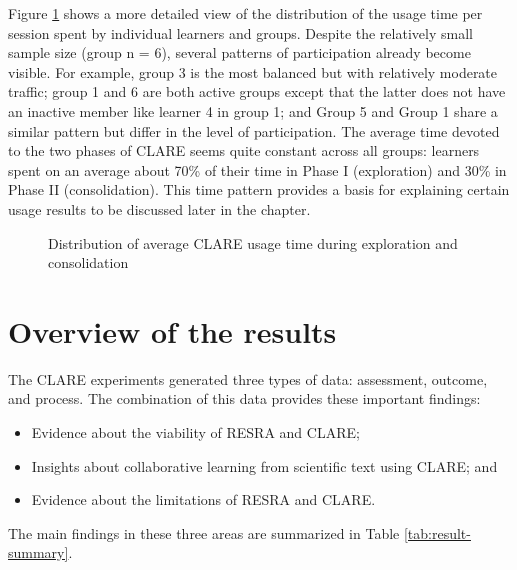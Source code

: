 Figure \ref{fig:time-distribution} shows a more detailed view of the
distribution of the usage time per session spent by individual learners and
groups. Despite the relatively small sample size (group n = 6), several
patterns of participation already become visible. For example, group 3 is
the most balanced but with relatively moderate traffic; group 1 and 6 are
both active groups except that the latter does not have an inactive member
like learner 4 in group 1; and Group 5 and Group 1 share a similar pattern
but differ in the level of participation. The average time devoted to the
two phases of CLARE seems quite constant across all groups: learners spent
on an average about 70\% of their time in Phase I (exploration) and 30\% in
Phase II (consolidation). This time pattern provides a basis for explaining
certain usage results to be discussed later in the chapter.

\begin{figure}[htbp]
 \caption{Distribution of average CLARE usage time during
 exploration and consolidation}
  \label{fig:time-distribution}
\end{figure}


\section{Overview of the results}
\label{sec:synopsis}

The CLARE experiments generated three types of data: assessment, outcome,
and process. The combination of this data provides these important
findings:

\begin{itemize}
\item Evidence about the viability of RESRA and CLARE;
  
\item Insights about collaborative learning from scientific text using
  CLARE; and

\item Evidence about the limitations of RESRA and CLARE.
\end{itemize}

The main findings in these three areas are summarized in Table
\ref{tab:result-summary}.


